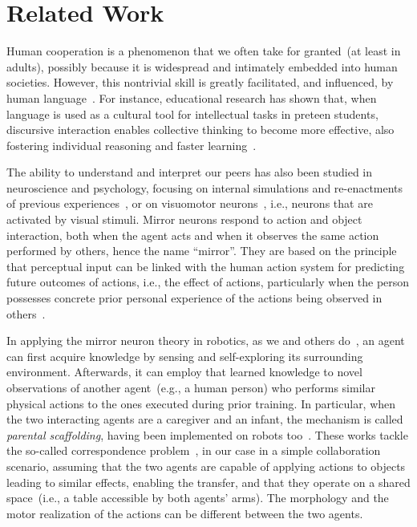 
\section{Related Work}
\label{sec:related_work}

Human cooperation is a phenomenon that we often take for granted~(at least in adults), possibly because it is widespread and intimately embedded into human societies.
However, this nontrivial skill is greatly facilitated, and influenced, by human language~\cite{mueller:2000:psych}.
For instance, educational research has shown that, when language is used as a cultural tool for intellectual tasks in preteen students, discursive interaction enables collective thinking to become more effective, also fostering individual reasoning and faster learning~\cite{rojas:2003:ijer}.

The ability to understand and interpret our peers has also been studied in neuroscience and psychology, focusing on internal simulations and re-enactments of previous experiences~\cite{schillaci:2012:hbu,billing:2016:frobt}, or on visuomotor neurons~\cite{rizzolatti:2001:nrn}, i.e., neurons that are activated by visual stimuli.
Mirror neurons respond to action and object interaction, both when the agent acts and when it observes the same action performed by others, hence the name ``mirror''.
They are based on the principle that perceptual input can be linked with the human action system for predicting future outcomes of actions, i.e., the effect of actions, particularly when the person possesses concrete prior personal experience of the actions being observed in others~\cite{aglioti:2008:basketball,knoblich:2001:psychsci}.

In applying the mirror neuron theory in robotics, as we and others do~\cite{gazzola:2007:neuroimage,lopes:2009:ab}, an agent can first acquire knowledge by sensing and self-exploring its surrounding environment.
Afterwards, it can employ that learned knowledge to novel observations of another agent~(e.g., a human person) who performs similar physical actions to the ones executed during prior training.
In particular, when the two interacting agents are a caregiver and an infant, the mechanism is called \emph{parental scaffolding}, having been implemented on robots too~\cite{ugur:2015:robotica,ugur:2015:tamd}.
These works tackle the so-called correspondence problem~\cite{nehaniv:2002:correspondence}, in our case in a simple collaboration scenario, assuming that the two agents are capable of applying actions to objects leading to similar effects, enabling the transfer, and that they operate on a shared space~(i.e., a table accessible by both agents' arms).
The morphology and the motor realization of the actions can be different between the two agents.

